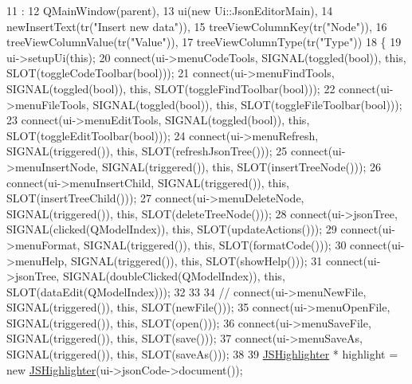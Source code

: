 \begin{DoxyCode}
11                                               :
12     QMainWindow(parent),
13     ui(\textcolor{keyword}{new} Ui::JsonEditorMain),
14     newInsertText(tr(\textcolor{stringliteral}{"Insert new data"})),
15     treeViewColumnKey(tr(\textcolor{stringliteral}{"Node"})),
16     treeViewColumnValue(tr(\textcolor{stringliteral}{"Value"})),
17     treeViewColumnType(tr(\textcolor{stringliteral}{"Type"}))
18 \{
19     ui->setupUi(\textcolor{keyword}{this});
20     connect(ui->menuCodeTools, SIGNAL(toggled(\textcolor{keywordtype}{bool})), \textcolor{keyword}{this}, SLOT(toggleCodeToolbar(\textcolor{keywordtype}{bool})));
21     connect(ui->menuFindTools, SIGNAL(toggled(\textcolor{keywordtype}{bool})), \textcolor{keyword}{this}, SLOT(toggleFindToolbar(\textcolor{keywordtype}{bool})));
22     connect(ui->menuFileTools, SIGNAL(toggled(\textcolor{keywordtype}{bool})), \textcolor{keyword}{this}, SLOT(toggleFileToolbar(\textcolor{keywordtype}{bool})));
23     connect(ui->menuEditTools, SIGNAL(toggled(\textcolor{keywordtype}{bool})), \textcolor{keyword}{this}, SLOT(toggleEditToolbar(\textcolor{keywordtype}{bool})));
24     connect(ui->menuRefresh, SIGNAL(triggered()), \textcolor{keyword}{this}, SLOT(refreshJsonTree()));
25     connect(ui->menuInsertNode, SIGNAL(triggered()), \textcolor{keyword}{this}, SLOT(insertTreeNode()));
26     connect(ui->menuInsertChild, SIGNAL(triggered()), \textcolor{keyword}{this}, SLOT(insertTreeChild()));
27     connect(ui->menuDeleteNode, SIGNAL(triggered()), \textcolor{keyword}{this}, SLOT(deleteTreeNode()));
28     connect(ui->jsonTree, SIGNAL(clicked(QModelIndex)), \textcolor{keyword}{this}, SLOT(updateActions()));
29     connect(ui->menuFormat, SIGNAL(triggered()), \textcolor{keyword}{this}, SLOT(formatCode()));
30     connect(ui->menuHelp, SIGNAL(triggered()), \textcolor{keyword}{this}, SLOT(showHelp()));
31     connect(ui->jsonTree, SIGNAL(doubleClicked(QModelIndex)), \textcolor{keyword}{this}, SLOT(dataEdit(QModelIndex)));
32 
33 
34 \textcolor{comment}{//    connect(ui->menuNewFile, SIGNAL(triggered()), this, SLOT(newFile()));}
35     connect(ui->menuOpenFile, SIGNAL(triggered()), \textcolor{keyword}{this}, SLOT(open()));
36     connect(ui->menuSaveFile, SIGNAL(triggered()), \textcolor{keyword}{this}, SLOT(save()));
37     connect(ui->menuSaveAs, SIGNAL(triggered()), \textcolor{keyword}{this}, SLOT(saveAs()));
38 
39     \hyperlink{class_j_s_highlighter}{JSHighlighter} * highlight = \textcolor{keyword}{new} \hyperlink{class_j_s_highlighter}{JSHighlighter}(ui->jsonCode->document());

\end{DoxyCode}
